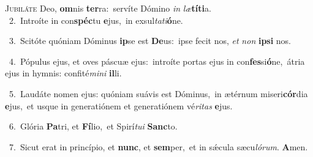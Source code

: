 \lettrine{\initial\textcolor{\initialcolor}{J}}{ubiláte} Deo, \textbf{om}\-nis \textbf{ter}\-ra:~\star servíte Dómino \textit{in} \textit{læ}\-\textbf{tí}\textbf{ti}a.\\
{\numbfont\textcolor{\numbcolor}{~2.}}~Introíte in con\-\textbf{spéc}\-tu \textbf{e}\-jus,~\star in exsul\-\textit{ta}\-\textit{ti}\textbf{ó}ne.\par
{\numbfont\textcolor{\numbcolor}{~3.}}~Scitóte quóniam Dóminus \textbf{ip}\-se est \textbf{De}\-us:~\star ipse fecit nos, \textit{et} \textit{non} \textbf{ip}\-\textbf{si} nos.\par
{\numbfont\textcolor{\numbcolor}{~4.}}~Pópulus ejus, et oves páscuæ ejus:~\dagger introíte portas ejus in con\-\textbf{fes}\-si\-\textbf{ó}\-ne,~\star átria ejus in hymnis: confité\-\textit{mi}\-\textit{ni} \textbf{il}\-li.\par
{\numbfont\textcolor{\numbcolor}{~5.}}~Laudáte nomen ejus: quóniam suávis est Dóminus,~\dagger in ætérnum miseri\-\textbf{cór}\-dia \textbf{e}\-jus,~\star et usque in generatiónem et generatiónem vé\-\textit{ri}\-\textit{tas} \textbf{e}\-jus.\par
{\numbfont\textcolor{\numbcolor}{~6.}}~Glória \textbf{Pa}\-tri, et \textbf{Fí}\-lio,~\star et Spirí\-\textit{tu}\-\textit{i} \textbf{Sanc}\-to.\par
{\numbfont\textcolor{\numbcolor}{~7.}}~Sicut erat in princípio, et \textbf{nunc}\-, et \textbf{sem}\-per,~\star et in sǽcula sæcu\-\textit{ló}\-\textit{rum}. \textbf{A}\-men.\par
